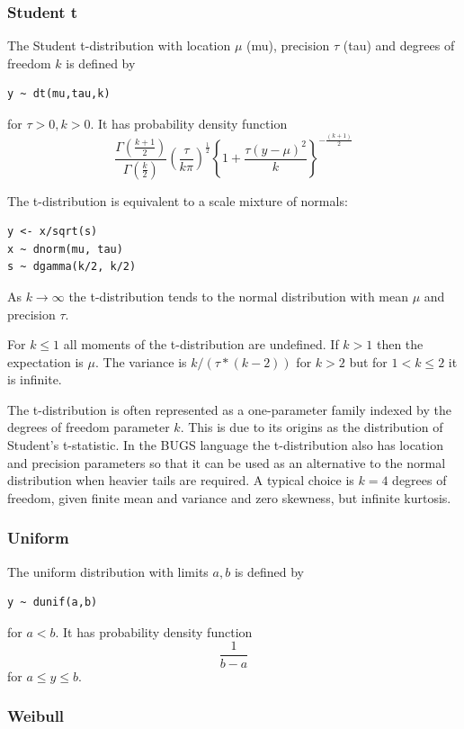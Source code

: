 \documentclass[11pt, a4paper, titlepage]{report}
\begin{document}
{\subsubsection{Student t}
\label{bugs:dt}

The Student t-distribution with location $\mu$ (mu), precision $\tau$
(tau) and degrees of freedom $k$ is defined by
\begin{verbatim}
y ~ dt(mu,tau,k)
\end{verbatim}
for $\tau > 0, k > 0$. It has probability density function
\[
\frac{\Gamma(\frac{k+1}{2})}{\Gamma(\frac{k}{2})} 
\left(\frac{\tau}{k\pi} \right)^{\frac{1}{2}} 
\left\{1 + \frac{\tau (y - \mu)^2}{k} \right\}^{-\frac{(k+1)}{2}}
\]

The t-distribution is equivalent to a scale mixture of normals:
\begin{verbatim}
y <- x/sqrt(s)
x ~ dnorm(mu, tau)
s ~ dgamma(k/2, k/2)
\end{verbatim}
As $k \rightarrow \infty$ the t-distribution tends to the normal distribution
with mean $\mu$ and precision $\tau$.

For $k \leq 1$ all moments of the t-distribution are undefined. If $k
> 1$ then the expectation is $\mu$. The variance is $k/(\tau*(k-2))$
for $k > 2$ but for $1 < k \leq 2$ it is infinite.

The t-distribution is often represented as a one-parameter family
indexed by the degrees of freedom parameter $k$. This is due to its
origins as the distribution of Student's t-statistic. In the BUGS
language the t-distribution also has location and precision parameters
so that it can be used as an alternative to the normal distribution
when heavier tails are required.  A typical choice is $k=4$ degrees of
freedom, given finite mean and variance and zero skewness, but
infinite kurtosis.

\subsubsection{Uniform}
\label{bugs:dunif}

The uniform distribution with limits $a, b$ is defined by
\begin{verbatim}
y ~ dunif(a,b)
\end{verbatim}
for $a < b$. It has probability density function
\[
\frac{\textstyle 1}{\textstyle b - a}
\]
for $a \leq y \leq b$.

\subsubsection{Weibull}
\label{bugs:dweib}

}
\end{document}
